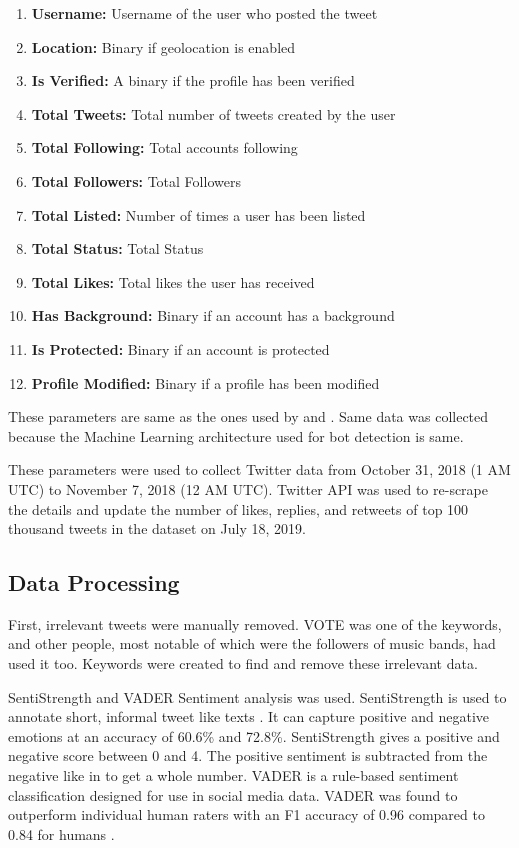 \documentclass[letterpaper]{article}
\begin{document}
\begin{enumerate}[label=\textbf{\arabic*}]
    \item \textbf{Username:} Username of the user who posted the tweet
    \item \textbf{Location:} Binary if geolocation is enabled
    \item \textbf{Is Verified:} A binary if the profile has been verified
    \item \textbf{Total Tweets:} Total number of tweets created by the user
    \item \textbf{Total Following:} Total accounts following
    \item \textbf{Total Followers:} Total Followers
    \item \textbf{Total Listed:} Number of times a user has been listed
    \item \textbf{Total Status:} Total Status
    \item \textbf{Total Likes:} Total likes the user has received
    \item \textbf{Has Background:}  Binary if an account has a background
    \item \textbf{Is Protected:}  Binary if an account is protected
    \item \textbf{Profile Modified:}  Binary if a profile has been modified
\end{enumerate}
\bigskip
These parameters are same as the ones used by \cite{kudugunta2018deep} and \cite{ferrara2017disinformation}. Same data was collected because the Machine Learning architecture used for bot 
detection is same. \par

These parameters were used to collect Twitter data from October 31, 2018 (1 AM UTC) to November 7, 2018 (12 AM UTC). Twitter API was used to re-scrape the details and update the number of likes, replies, and retweets of top 100 thousand tweets  
in the dataset on July 18, 2019.

\subsection{Data Processing}
First, irrelevant tweets were manually removed. VOTE was one of the keywords, and other people, most notable of which were the followers of music bands, had used it too. Keywords were created to find and remove these irrelevant data.\par

SentiStrength and VADER Sentiment analysis was used. SentiStrength \cite{thelwall2010sentiment} is used to annotate short, informal tweet like texts \cite{bessi2016social}. 
It can capture positive and negative emotions at an accuracy of 60.6\% and 72.8\%. SentiStrength gives a positive and negative score between 0 and 4. The positive sentiment is subtracted 
from the negative like in \cite{bessi2016social} to get a whole number. VADER is a rule-based sentiment classification designed for use in social media data. VADER was found to outperform 
individual human raters with an F1 accuracy of 0.96 compared to 0.84 for humans \cite{hutto2014vader}.
\end{document}
